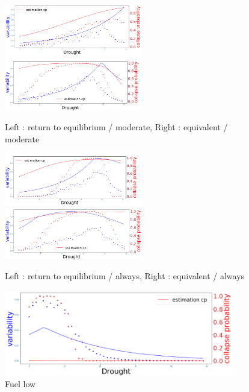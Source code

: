 \documentclass{article}
\begin{document}
\begin{figure}[h]
\begin{center}
\includegraphics[width=6cm]{results/drought/return_moderate.png}
\includegraphics[width=6cm]{results/drought/equivalent_moderate.png}
\end{center}
\caption{\label{fig:temp}Left : return to equilibrium / moderate, Right : equivalent / moderate}
\end{figure}

\begin{figure}[h]
\begin{center}
\includegraphics[width=6cm]{results/drought/return_always.png}
\includegraphics[width=6cm]{results/drought/equivalent_always.png}
\end{center}
\caption{\label{fig:temp}Left : return to equilibrium / always, Right : equivalent / always}
\end{figure}

\begin{figure}[h]
\begin{center}
\includegraphics[width=10cm]{results/drought/fuel_low.png}
\end{center}
\caption{\label{fig:temp}Fuel low}
\end{figure}
\end{document}
